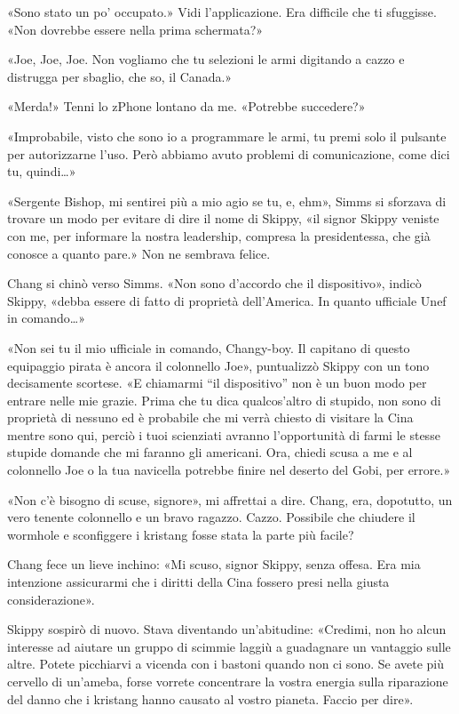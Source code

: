«Sono stato un po' occupato.» Vidi l'applicazione. Era difficile che ti
sfuggisse. «Non dovrebbe essere nella prima schermata?»

«Joe, Joe, Joe. Non vogliamo che tu selezioni le armi digitando a cazzo
e distrugga per sbaglio, che so, il Canada.»

«Merda!» Tenni lo zPhone lontano da me. «Potrebbe succedere?»

«Improbabile, visto che sono io a programmare le armi, tu premi solo il
pulsante per autorizzarne l'uso. Però abbiamo avuto problemi di
comunicazione, come dici tu, quindi\ldots»

«Sergente Bishop, mi sentirei più a mio agio se tu, e, ehm», Simms si
sforzava di trovare un modo per evitare di dire il nome di Skippy, «il
signor Skippy veniste con me, per informare la nostra leadership,
compresa la presidentessa, che già conosce a quanto pare.» Non ne
sembrava felice.

Chang si chinò verso Simms. «Non sono d'accordo che il dispositivo»,
indicò Skippy, «debba essere di fatto di proprietà dell'America. In
quanto ufficiale Unef in comando\ldots»

«Non sei tu il mio ufficiale in comando, Changy-boy. Il capitano di
questo equipaggio pirata è ancora il colonnello Joe», puntualizzò Skippy
con un tono decisamente scortese. «E chiamarmi ``il dispositivo'' non è
un buon modo per entrare nelle mie grazie. Prima che tu dica
qualcos'altro di stupido, non sono di proprietà di nessuno ed è
probabile che mi verrà chiesto di visitare la Cina mentre sono qui,
perciò i tuoi scienziati avranno l'opportunità di farmi le stesse
stupide domande che mi faranno gli americani. Ora, chiedi scusa a me e
al colonnello Joe o la tua navicella potrebbe finire nel deserto del
Gobi, per errore.»

«Non c'è bisogno di scuse, signore», mi affrettai a dire. Chang, era,
dopotutto, un vero tenente colonnello e un bravo ragazzo. Cazzo.
Possibile che chiudere il wormhole e sconfiggere i kristang fosse stata
la parte più facile?

Chang fece un lieve inchino: «Mi scuso, signor Skippy, senza offesa. Era
mia intenzione assicurarmi che i diritti della Cina fossero presi nella
giusta considerazione».

Skippy sospirò di nuovo. Stava diventando un'abitudine: «Credimi, non ho
alcun interesse ad aiutare un gruppo di scimmie laggiù a guadagnare un
vantaggio sulle altre. Potete picchiarvi a vicenda con i bastoni quando
non ci sono. Se avete più cervello di un'ameba, forse vorrete
concentrare la vostra energia sulla riparazione del danno che i kristang
hanno causato al vostro pianeta. Faccio per dire».

